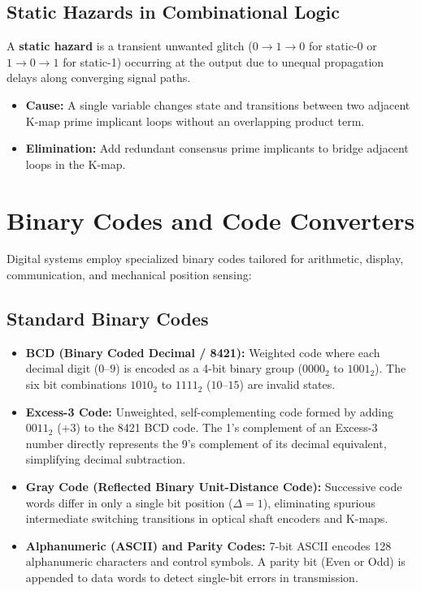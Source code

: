 \documentclass[12pt,a4paper]{article}
\begin{document}
\subsection{Static Hazards in Combinational Logic}
A \textbf{static hazard} is a transient unwanted glitch ($0 \to 1 \to 0$ for static-0 or $1 \to 0 \to 1$ for static-1) occurring at the output due to unequal propagation delays along converging signal paths.
\begin{itemize}[leftmargin=*, itemsep=3pt]
  \item \textbf{Cause:} A single variable changes state and transitions between two adjacent K-map prime implicant loops without an overlapping product term.
  \item \textbf{Elimination:} Add redundant consensus prime implicants to bridge adjacent loops in the K-map.
\end{itemize}

\section{Binary Codes and Code Converters}

Digital systems employ specialized binary codes tailored for arithmetic, display, communication, and mechanical position sensing:

\subsection{Standard Binary Codes}
\begin{itemize}[leftmargin=*, itemsep=3pt]
  \item \textbf{BCD (Binary Coded Decimal / 8421):} Weighted code where each decimal digit ($0\text{--}9$) is encoded as a 4-bit binary group ($0000_2$ to $1001_2$). The six bit combinations $1010_2$ to $1111_2$ ($10\text{--}15$) are invalid states.
  \item \textbf{Excess-3 Code:} Unweighted, self-complementing code formed by adding $0011_2$ ($+3$) to the 8421 BCD code. The 1's complement of an Excess-3 number directly represents the 9's complement of its decimal equivalent, simplifying decimal subtraction.
  \item \textbf{Gray Code (Reflected Binary Unit-Distance Code):} Successive code words differ in only a single bit position ($\Delta = 1$), eliminating spurious intermediate switching transitions in optical shaft encoders and K-maps.
  \item \textbf{Alphanumeric (ASCII) and Parity Codes:} 7-bit ASCII encodes 128 alphanumeric characters and control symbols. A parity bit (Even or Odd) is appended to data words to detect single-bit errors in transmission.
\end{itemize}
\end{document}
